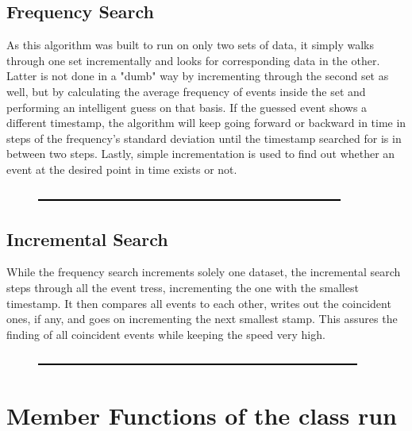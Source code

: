      \subsection{Frequency Search}
      \label{ch:Analysis software:sec:Search algorithms:subsec:Frequency Search}
      As this algorithm was built to run on only two sets of data, it simply walks through one set incrementally and looks for corresponding data in the other. Latter is not done in a "dumb" way by incrementing through the second set as well, but by calculating the average frequency of events inside the set and performing an intelligent guess on that basis. If the guessed event shows a different timestamp, the algorithm will keep going forward or backward in time in steps of the frequency's standard deviation until the timestamp searched for is in between two steps. Lastly, simple incrementation is used to find out whether an event at the desired point in time exists or not.
      \begin{figure}
	\centering
      	\includegraphics[width = 0.9\textwidth]{graphics/frequencySearch.eps}
      \end{figure}
      \subsection{Incremental Search}
      \label{ch:Analysis software:sec:Search algorithms:subsec: Incremental Search}
      While the frequency search increments solely one dataset, the incremental search steps through all the event tress, incrementing the one with the smallest timestamp. It then compares all events to each other, writes out the coincident ones, if any, and goes on incrementing the next smallest stamp. This assures the finding of all coincident events while keeping the speed very high.
      \begin{figure}
	\centering
      	\includegraphics[width = 0.9 \textwidth]{graphics/incrementalSearch.eps}
      \end{figure} 
  \section{Member Functions of the class {\bf run}}
  \label{ch:Analysis software:sec:methods of the class run}
  

